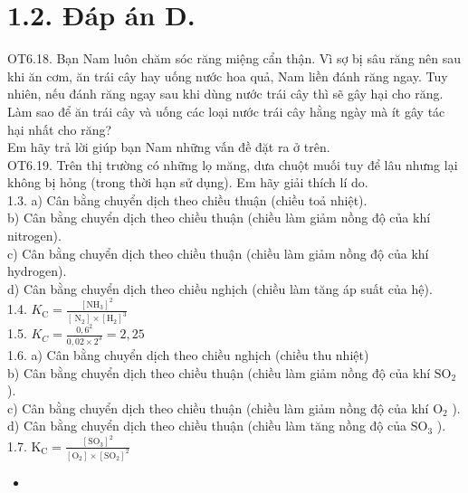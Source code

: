 \documentclass[10pt]{article}
\begin{document}
\section*{1.2. Đáp án D.}
OT6.18. Bạn Nam luôn chăm sóc răng miệng cẩn thận. Vì sợ bị sâu răng nên sau khi ăn cơm, ăn trái cây hay uống nước hoa quả, Nam liền đánh răng ngay. Tuy nhiên, nếu đánh răng ngay sau khi dùng nước trái cây thì sẽ gây hại cho răng. Làm sao để ăn trái cây và uống các loại nước trái cây hằng ngày mà ít gây tác hại nhất cho răng?\\
Em hãy trả lời giúp bạn Nam những vấn đề đặt ra ở trên.\\
OT6.19. Trên thị trường có những lọ măng, dưa chuột muối tuy để lâu nhưng lại không bị hỏng (trong thời hạn sử dụng). Em hãy giải thích lí do.\\
1.3. a) Cân bằng chuyển dịch theo chiều thuận (chiều toả nhiệt).\\
b) Cân bằng chuyển dịch theo chiều thuận (chiều làm giảm nồng độ của khí nitrogen).\\
c) Cân bằng chuyển dịch theo chiều thuận (chiều làm giảm nồng độ của khí hydrogen).\\
d) Cân bằng chuyển dịch theo chiều nghịch (chiều làm tăng áp suất của hệ).\\
1.4. $K_{\mathrm{C}}=\frac{\left[\mathrm{NH}_{3}\right]^{2}}{\left[\mathrm{~N}_{2}\right] \times\left[\mathrm{H}_{2}\right]^{3}}$\\
1.5. $K_{C}=\frac{0,6^{2}}{0,02 \times 2^{3}}=2,25$\\
1.6. a) Cân bằng chuyển dịch theo chiều nghịch (chiều thu nhiệt)\\
b) Cân bằng chuyển dịch theo chiều thuận (chiều làm giảm nồng độ của khí $\mathrm{SO}_{2}$ ).\\
c) Cân bằng chuyển dịch theo chiều thuận (chiều làm giảm nồng độ của khí $\mathrm{O}_{2}$ ).\\
d) Cân bằng chuyển dịch theo chiều thuận (chiều làm tăng nồng độ của $\mathrm{SO}_{3}$ ).\\
1.7. $\mathrm{K}_{\mathrm{C}}=\frac{\left[\mathrm{SO}_{3}\right]^{2}}{\left[\mathrm{O}_{2}\right] \times\left[\mathrm{SO}_{2}\right]^{2}}$

\begin{itemize}
  \item 
\end{itemize}
\end{document}
